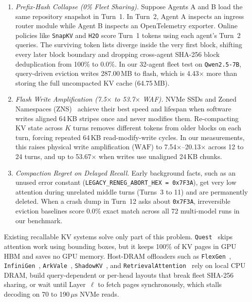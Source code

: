\documentclass[pdflatex,sn-mathphys-num]{sn-jnl}
\theoremstyle{thmstyleone}
\newcommand{\WAF}{\mathrm{WAF}}
\begin{document}
\begin{enumerate}
  \item \emph{Prefix-Hash Collapse (0\% Fleet Sharing).} Suppose Agents A and B load the same repository snapshot in Turn~1. In Turn~2, Agent A inspects an ingress router module while Agent B inspects an OpenTelemetry exporter. Online policies like \texttt{SnapKV} and \texttt{H2O} score Turn~1 tokens using each agent's Turn~2 queries. The surviving token lists diverge inside the very first block, shifting every later block boundary and dropping cross-agent SHA-256 block deduplication from 100\% to 0.0\%. In our 32-agent fleet test on \texttt{Qwen2.5-7B}, query-driven eviction writes 287.00\,MB to flash, which is 4.43$\times$ more than storing the full uncompacted KV cache (64.75\,MB).

  \item \emph{Flash Write Amplification (7.5$\times$ to 53.7$\times$ WAF).} NVMe SSDs and Zoned Namespaces (ZNS)~\cite{hu2009waf,bjorling2021zns,rosenblum1992lfs} achieve their best speed and lifespan when software writes aligned 64\,KB stripes once and never modifies them. Re-compacting KV state across $K$ turns removes different tokens from older blocks on each turn, forcing repeated 64\,KB read-modify-write cycles. In our measurements, this raises physical write amplification ($\WAF$) to 7.54$\times$--20.13$\times$ across 12 to 24 turns, and up to 53.67$\times$ when writes use unaligned 24\,KB chunks.

  \item \emph{Compaction Regret on Delayed Recall.} Early background facts, such as an unused error constant (\texttt{LEGACY\_RENEG\_ABORT\_HEX = 0x7F3A}), get very low attention during unrelated middle turns (Turns~3 to 11) and are permanently deleted. When a crash dump in Turn~12 asks about \texttt{0x7F3A}, irreversible eviction baselines score 0.0\% exact match across all 72 multi-model runs in our benchmark.
\end{enumerate}

Existing recallable KV systems solve only part of this problem. \texttt{Quest}~\cite{tang2024quest} skips attention work using bounding boxes, but it keeps 100\% of KV pages in GPU HBM and saves no GPU memory. Host-DRAM offloaders such as \texttt{FlexGen}~\cite{sheng2023flexgen}, \texttt{InfiniGen}~\cite{lee2024infinigen}, \texttt{ArkVale}~\cite{chen2024arkvale}, \texttt{ShadowKV}~\cite{sun2025shadowkv}, and \texttt{RetrievalAttention}~\cite{liu2024retrievalattention} rely on local CPU DRAM, build query-dependent or per-head layouts that break fleet SHA-256 sharing, or wait until Layer~$\ell$ to fetch pages synchronously, which stalls decoding on 70 to 190\,$\mu\mathrm{s}$ NVMe reads.
\end{document}

